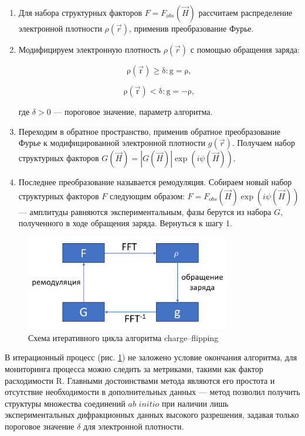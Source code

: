 \begin{enumerate}
	\item Для набора структурных факторов $F = F_{obs}(\overrightarrow{H})$ рассчитаем распределение электронной плотности $\rho(\overrightarrow{r})$, применив преобразование Фурье.
	\item Модифицируем электронную плотность $\rho(\overrightarrow{r})$ с помощью обращения заряда:
	
	\begin{equation}
		\mathrm{\rho(\overrightarrow{r})\geq \delta: g = \rho,}
	\end{equation}
	
	\begin{equation}
	\mathrm{\rho(\overrightarrow{r})<\delta: g = -\rho,}
	\end{equation}
		
	где $\delta > 0$ --- пороговое значение, параметр алгоритма.
	\item Переходим в обратное пространство, применив обратное преобразование Фурье к модифицированной электронной плотности $g(\overrightarrow{r})$. Получаем набор структурных факторов $G(\overrightarrow{H}) = |G(\overrightarrow{H})|\exp(i\psi(\overrightarrow{H}))$.
	\item Последнее преобразование называется ремодуляция. Собираем новый набор структурных факторов $F$ следующим образом: $F = F_{obs}(\overrightarrow{H})\exp(i\psi(\overrightarrow{H}))$ --- амплитуды равняются экспериментальным, фазы берутся из набора $G$, полученного в ходе обращения заряда. Вернуться к шагу 1.
\end{enumerate}

\begin{figure}[H]
	\centering
	\includegraphics[width=0.8\textwidth]{figures/charge-flip.png}\hfill
	\caption{Схема итеративного цикла алгоритма charge--flipping}
	\label{chfl}
\end{figure}

В итерационный процесс (рис. \ref{chfl}) не заложено условие окончания алгоритма, для мониторинга процесса можно следить за метриками, такими как фактор расходимости R. Главными достоинствами метода являются его простота и отсутствие необходимости в дополнительных данных --- метод позволил получить структуры множества соединений $ab$ $initio$ при наличии лишь экспериментальных дифракционных данных высокого разрешения, задавая только пороговое значение $\delta$ для электронной плотности.

